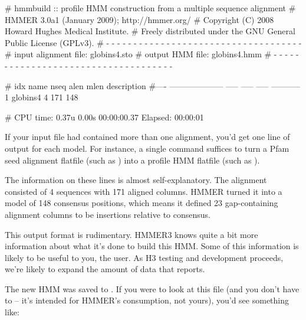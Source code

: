 \begin{sreoutput}
# hmmbuild :: profile HMM construction from a multiple sequence alignment
# HMMER 3.0a1 (January 2009); http://hmmer.org/
# Copyright (C) 2008 Howard Hughes Medical Institute.
# Freely distributed under the GNU General Public License (GPLv3).
# - - - - - - - - - - - - - - - - - - - - - - - - - - - - - - - - - - - -
# input alignment file:             globins4.sto
# output HMM file:                  globins4.hmm
# - - - - - - - - - - - - - - - - - - - - - - - - - - - - - - - - - - - -

# idx name                  nseq  alen  mlen  description
#---- -------------------- ----- ----- -----  -----------
1     globins4                 4   171   148

# CPU time: 0.37u 0.00s 00:00:00.37 Elapsed: 00:00:01
\end{sreoutput}


If your input file had contained more than one alignment, you'd get
one line of output for each model. For instance, a single
 command suffices to turn a Pfam seed alignment
flatfile (such as ) into a profile HMM flatfile
(such as ).

The information on these lines is almost self-explanatory. The
 alignment consisted of 4 sequences with 171 aligned
columns. HMMER turned it into a model of 148 consensus positions,
which means it defined 23 gap-containing alignment columns to be
insertions relative to consensus.

This output format is rudimentary.  HMMER3 knows quite a bit more
information about what it's done to build this HMM. Some of this
information is likely to be useful to you, the user. As H3 testing and
development proceeds, we're likely to expand the amount of data that
 reports.

The new HMM was saved to . If you were to look at
this file (and you don't have to -- it's intended for HMMER's
consumption, not yours), you'd see something like:

